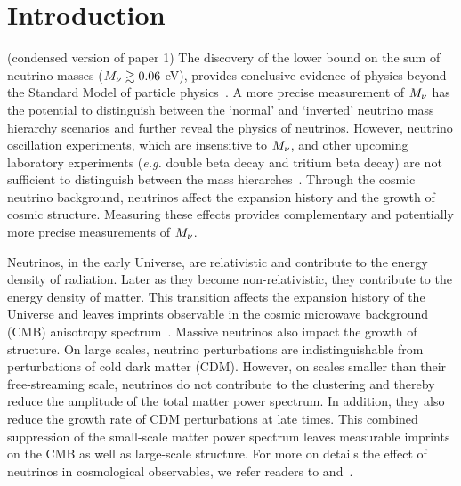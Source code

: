 \section{Introduction} \label{sec:intro}

 (condensed version of paper 1)
The discovery of the lower bound on the sum of neutrino masses 
($M_\nu \gtrsim 0.06$ eV), provides conclusive evidence of 
physics beyond the Standard Model of particle physics~\citep{forero2014, gonzalez-garcia2016}. 
A more precise measurement of $M_\nu$ has the potential to distinguish 
between the `normal' and `inverted' neutrino mass hierarchy scenarios 
and further reveal the physics of neutrinos. However, neutrino 
oscillation experiments, which are insensitive to $M_\nu$, and other 
upcoming laboratory experiments (\emph{e.g.} double beta decay and 
tritium beta decay) are not sufficient to distinguish between the mass 
hierarches~\citep{bonn2011, drexlin2013}. Through the cosmic neutrino 
background, neutrinos affect the expansion history and the growth of 
cosmic structure. Measuring these effects provides complementary and 
potentially more precise measurements of $M_\nu$. 

Neutrinos, in the early Universe, are relativistic and contribute to the 
energy density of radiation. Later as they become non-relativistic, 
they contribute to the energy density of matter. This transition affects 
the expansion history of the Universe and leaves imprints observable in 
the cosmic microwave background (CMB) anisotropy spectrum~\citep{lesgourgues2012, lesgourgues2014}. 
Massive neutrinos also impact the growth of structure. On large scales, 
neutrino perturbations are indistinguishable from perturbations of cold 
dark matter (CDM). However, on scales smaller than their free-streaming 
scale, neutrinos do not contribute to the clustering and thereby reduce 
the amplitude of the total matter power spectrum. In addition, they also reduce the growth 
rate of CDM perturbations at late times. This combined suppression of 
the small-scale matter power spectrum leaves measurable imprints 
on the CMB as well as large-scale structure. For more on details the effect
of neutrinos in cosmological observables, we refer readers to 
\cite{lesgourgues2012,lesgourgues2014} and~\cite{gerbino2018}. 


